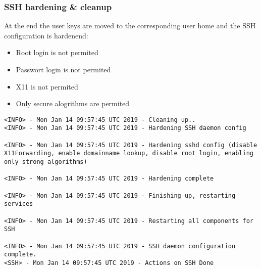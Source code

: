 \subsubsection{SSH hardening \& cleanup}
At the end the user keys are moved to the corresponding user home and the SSH configuration is hardenend:
\begin{itemize}
\item Root login is not permited
\item Passwort login is not permited
\item X11 is not permited
\item Only secure alogrithms are permited
\end{itemize}
\begin{lstlisting}[escapeinside=||]
<INFO> - Mon Jan 14 09:57:45 UTC 2019 - Cleaning up..
<INFO> - Mon Jan 14 09:57:45 UTC 2019 - Hardening SSH daemon config
                                                                                                                                                                                                                                                                                                                                              
<INFO> - Mon Jan 14 09:57:45 UTC 2019 - Hardening sshd config (disable X11Forwarding, enable domainname lookup, disable root login, enabling only strong algorithms)

<INFO> - Mon Jan 14 09:57:45 UTC 2019 - Hardening complete
                                                                                                                                                                                                                                                                                                                                              
<INFO> - Mon Jan 14 09:57:45 UTC 2019 - Finishing up, restarting services
                                                                                                                                                                                                                                                                                                                                              
<INFO> - Mon Jan 14 09:57:45 UTC 2019 - Restarting all components for SSH
                                                                                                                                                                                                                                                                                                                                              
<INFO> - Mon Jan 14 09:57:45 UTC 2019 - SSH daemon configuration complete.
<SSH> - Mon Jan 14 09:57:45 UTC 2019 - Actions on SSH Done
 \end{lstlisting}

